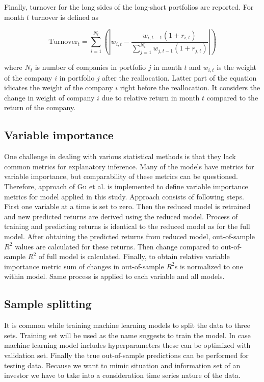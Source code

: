 \documentclass{article}
\begin{document}
Finally, turnover for the long sides of the long-short portfolios are reported. For month $t$ turnover is defined as \par

\begin{equation}
\label{eq:Turnover}
\text{Turnover}_t = \sum_{i=1}^{N_t}  \left ( \left | w_{i, t} - \frac{w_{i, t-1}(1 + r_{i, t})}{ \sum_{j=1}^{N_{t}} w_{j, t-1}(1 + r_{j, t})} \right | \right )
\end{equation}

where $N_t$ is number of companies in portfolio $j$ in month $t$ and $w_{i, t}$ is the weight of the company $i$ in portfolio $j$ after the reallocation. Latter part of the equation idicates the weight of the company $i$ right before the reallocation. It considers the change in weight of company $i$ due to relative return in month $t$ compared to the return of the company.

\subsection{Variable importance} \label{VariableImportance}

One challenge in dealing with various statistical methods is that they lack common metrics for explanatory inference. Many of the models have metrics for variable importance, but comparability of these metrics can be questioned. Therefore, approach of Gu et al. \citeyear{guetal} is implemented to define variable importance metrics for model applied in this study. Approach consists of following steps. First one variable at a time is set to zero. Then the reduced model is retrained and new predicted returns are derived using the reduced model. Process of training and predicting returns is identical to the reduced model as for the full model. After obtaining the predicted returns from reduced model, out-of-sample $R^2$ values are calculated for these returns. Then change compared to out-of-sample $R^2$ of full model is calculated. Finally, to obtain relative variable importance metric sum of changes in out-of-sample $R^2$s is normalized to one within model. Same process is applied to each variable and all models. \par

\subsection{Sample splitting} \label{SampleSplitting}

It is common while training machine learning models to split the data to three sets. Training set will be used as the name suggests to train the model. In case machine learning model includes hyperparameters these can be optimized with validation set. Finally the true out-of-sample predictions can be performed for testing data. Because we want to mimic situation and information set of an investor we have to take into a consideration time series nature of the data. \par
\end{document}
